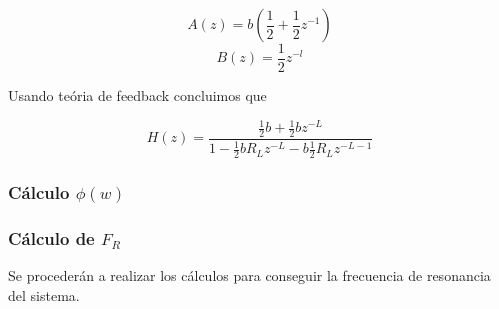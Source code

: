 \documentclass[assd_tp2_main.tex]{subfiles}
\begin{document}
\begin{equation}
	A(z)=b(\frac{1}{2}+\frac{1}{2}z^{-1})
\end{equation}
\begin{equation}
	B(z)=\frac{1}{2}z^{-l}
\end{equation}

Usando teória de feedback concluimos que

\begin{equation}
	H(z)=\frac{\frac{1}{2}b+\frac{1}{2}bz^{-L}}{1-\frac{1}{2}bR_Lz^{-L}-b\frac{1}{2}R_Lz^{-L-1}}
\end{equation}

\subsubsection{Cálculo $\phi(w)$}


\subsubsection{Cálculo de $F_R$}
Se procederán a realizar los cálculos para conseguir la frecuencia de resonancia del sistema.
\end{document}
